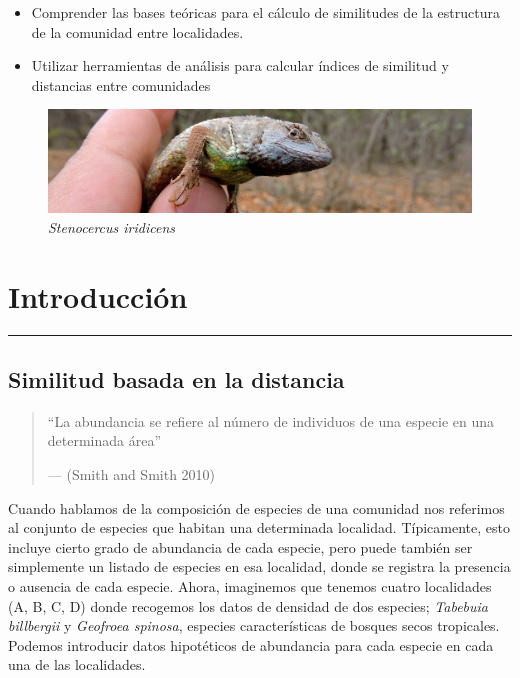 \documentclass[]{book}
\providecommand{\tightlist}{%
  \setlength{\itemsep}{0pt}\setlength{\parskip}{0pt}}
\begin{document}
\begin{itemize}
\tightlist
\item
  Comprender las bases teóricas para el cálculo de similitudes de la
  estructura de la comunidad entre localidades.
\item
  Utilizar herramientas de análisis para calcular índices de similitud y
  distancias entre comunidades
\end{itemize}

\begin{figure}[htbp]
\centering
\includegraphics{lagar.jpg}
\caption{\emph{Stenocercus iridicens}}
\end{figure}

\chapter{Introducción}\label{introduccion}

\begin{center}\rule{0.5\linewidth}{\linethickness}\end{center}

\section{Similitud basada en la
distancia}\label{similitud-basada-en-la-distancia}

\begin{quote}
``La abundancia se refiere al número de individuos de una especie en una
determinada área''

--- (Smith and Smith 2010)
\end{quote}

Cuando hablamos de la composición de especies de una comunidad nos
referimos al conjunto de especies que habitan una determinada localidad.
Típicamente, esto incluye cierto grado de abundancia de cada especie,
pero puede también ser simplemente un listado de especies en esa
localidad, donde se registra la presencia o ausencia de cada especie.
Ahora, imaginemos que tenemos cuatro localidades (A, B, C, D) donde
recogemos los datos de densidad de dos especies; \emph{Tabebuia
billbergii} y \emph{Geofroea spinosa}, especies características de
bosques secos tropicales. Podemos introducir datos hipotéticos de
abundancia para cada especie en cada una de las localidades.
\end{document}
